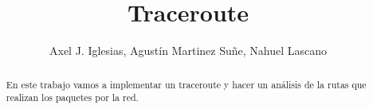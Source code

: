\documentclass[%
	final,
	narroweqnarray,
	inline,
	twoside,
	]{ieee}
\newcommand{\latexiie}{\LaTeX2{\Large$_\varepsilon$}}
\begin{document}
\title[Traceroute]{%
      Traceroute}

\author{Axel J. Iglesias, Agustín Martinez Suñe, Nahuel Lascano
}




\maketitle               

\begin{abstract} 
En este trabajo vamos a implementar un traceroute y hacer un análisis de la rutas que realizan los paquetes por la red.\end{abstract}


\end{document}
